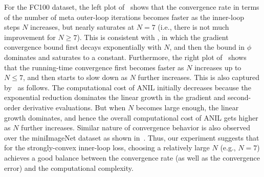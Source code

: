 \documentclass{osudissert96}
\begin{document}
For the FC100 dataset, the left plot of~ shows that the convergence rate in terms of the number of meta outer-loop iterations becomes faster as the inner-loop steps $N$ increases, but nearly saturates at $N=7$ (i.e., there is not much improvement for $N\geq 7$).
This is consistent with , in which the gradient convergence bound first  
 decays exponentially with $N$, and then the bound in $\phi$ dominates and saturates to a constant. Furthermore, the right plot of~ shows that the running-time convergence first becomes faster  as $N$ increases up to $N\leq 7$, and then starts to slow down as $N$ further increases. 
This is also captured by~ as follows. 
The computational cost of ANIL initially decreases because the exponential reduction dominates the linear growth in the gradient and second-order derivative evaluations. But when $N$ becomes large enough, the linear growth dominates, and hence the overall computational cost of ANIL gets higher as $N$ further increases. 
Similar nature of convergence behavior is also observed over the miniImageNet dataset as shown in~.  Thus, our experiment suggests that for the strongly-convex inner-loop loss, choosing a relatively large $N$ (e.g., $N=7$) 
achieves a good balance between the convergence rate (as well as the convergence error) and the computational complexity.  
\end{document}
